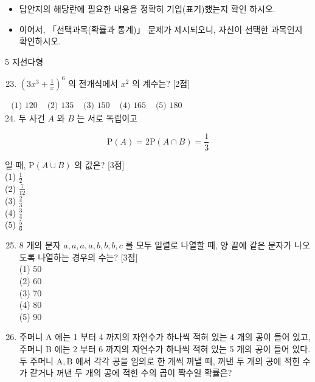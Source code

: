 \documentclass[10pt]{article}
\begin{document}
\begin{itemize}
  \item 답안지의 해당란에 필요한 내용을 정확히 기입(표기)했는지 확인 하시오.

  \item 이어서, 「선택과목(확률과 통계)」 문제가 제시되오니, 자신이 선택한 과목인지 확인하시오.

\end{itemize}

5 지선다형

\begin{enumerate}
  \setcounter{enumi}{22}
  \item \(\left(3 x^{3}+\frac{1}{x}\right)^{6}\) 의 전개식에서 \(x^{2}\) 의 계수는? [2점]
\end{enumerate}

\(\begin{array}{lllll}\text { (1) } 120 & \text { (2) } 135 & \text { (3) } 150 & \text { (4) } 165 & \text { (5) } 180\end{array}\)\\
24. 두 사건 \(A\) 와 \(B\) 는 서로 독립이고

\[
\mathrm{P}(A)=2 \mathrm{P}(A \cap B)=\frac{1}{3}
\]

일 때, \(\mathrm{P}(A \cup B)\) 의 값은? [3점]\\
(1) \(\frac{1}{2}\)\\
(2) \(\frac{7}{12}\)\\
(3) \(\frac{2}{3}\)\\
(4) \(\frac{3}{4}\)\\
(5) \(\frac{5}{6}\)

\begin{enumerate}
  \setcounter{enumi}{24}
  \item 8 개의 문자 \(a, a, a, a, b, b, b, c\) 를 모두 일렬로 나열할 때, 양 끝에 같은 문자가 나오도록 나열하는 경우의 수는? [3점]\\
(1) 50\\
(2) 60\\
(3) 70\\
(4) 80\\
(5) 90

  \item 주머니 A 에는 1 부터 4 까지의 자연수가 하나씩 적혀 있는 4 개의 공이 들어 있고, 주머니 B 에는 2 부터 6 까지의 자연수가 하나씩 적혀 있는 5 개의 공이 들어 있다. 두 주머니 \(\mathrm{A}, \mathrm{B}\) 에서 각각 공을 임의로 한 개씩 꺼낼 때, 꺼낸 두 개의 공에 적힌 수가 같거나 꺼낸 두 개의 공에 적힌 수의 곱이 짝수일 확률은?

\end{enumerate}
\end{document}
